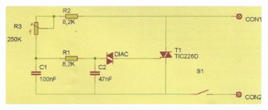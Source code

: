 \documentclass[12pt, fleqn]{article}                            %
\theoremstyle{break}                                            %
\begin{document}
        \begin{figure}[h]
            \centering
            \includegraphics[width=0.85\textwidth]{Aplicaciones3}
        \end{figure}
\end{document}

